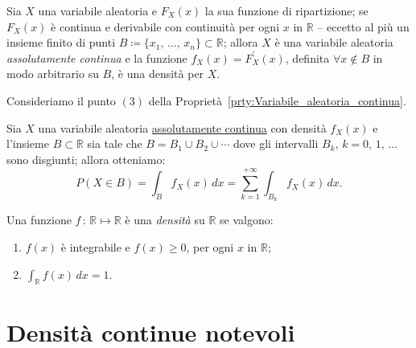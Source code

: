 \begin{prty}
\begin{prty}
                Sia $X$ una variabile aleatoria e $F_X(x)$ la sua funzione di ripartizione; se $F_X(x)$ è continua e derivabile con continuità per ogni $x$ in $\mathbb{R}$ \--- eccetto al più un insieme finito di punti $B \coloneqq \{x_1,\,\ldots,\, x_n\} \subset \mathbb{R}$; allora $X$ è una variabile aleatoria \emph{assolutamente continua} e la funzione $f_X(x) = F^{\prime}_X(x)$, definita $\forall x \notin B$ in modo arbitrario su $B$, è una densità per $X$.
            \end{prty}
            \begin{obsv}
                Consideriamo il punto $(3)$ della Proprietà~\ref{prty:Variabile_aleatoria_continua}.

                Sia $X$ una variabile aleatoria \underline{assolutamente continua} con densità $f_X(x)$ e l'insieme $B \subset \mathbb{R}$ sia tale che $B = B_1 \cup B_2 \cup \dotsm$ dove gli intervalli $B_k,\, k = 0,\,1,\,\ldots$ sono disgiunti; allora otteniamo: \[
                    P(X \in B) = \int_{B} f_X(x)\, dx = \sum_{k=1}^{+\infty} \int_{B_k} f_X(x)\, dx
                .\] 
            \end{obsv}
            \begin{obsv}
                Una funzione $f\,:\, \mathbb{R} \mapsto \mathbb{R}$ è una \emph{densità} su $\mathbb{R}$ se valgono:
                \begin{enumerate}
                    \item $f(x)$ è integrabile e $f(x) \geq 0$, per ogni $x$ in $\mathbb{R}$;
                    \item $\int_{\mathbb{R}} f(x)\, dx = 1$.
                \end{enumerate}
            \end{obsv}
        \end{prty}
    \section{Densità continue notevoli}
